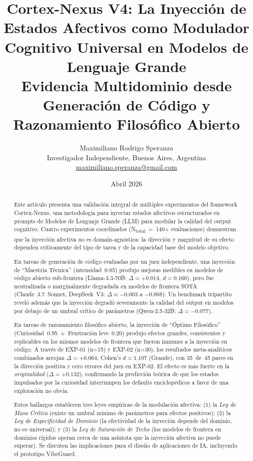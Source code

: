 \documentclass[12pt, a4paper]{article}
\title{\textbf{Cortex-Nexus V4: La Inyección de Estados Afectivos como Modulador Cognitivo Universal en Modelos de Lenguaje Grande}\\
\large{Evidencia Multidominio desde Generación de Código y Razonamiento Filosófico Abierto}}
\author{
  Maximiliano Rodrigo Speranza\\
  \small{Investigador Independiente, Buenos Aires, Argentina}\\
  \small{\href{mailto:maximiliano.speranza@gmail.com}{maximiliano.speranza@gmail.com}}
}
\date{Abril 2026}
\begin{document}
\maketitle
\begin{abstract}
Este artículo presenta una validación integral de múltiples experimentos del framework Cortex-Nexus, una metodología para inyectar estados afectivos estructurados en prompts de Modelos de Lenguaje Grande (LLM) para modular la calidad del output cognitivo. Cuatro experimentos coordinados (N\textsubscript{total}~=~140+ evaluaciones) demuestran que la inyección afectiva no es domain-agnóstica: la dirección y magnitud de su efecto dependen críticamente del tipo de tarea y de la capacidad base del modelo objetivo.

En tareas de generación de código evaluadas por un juez independiente, una inyección de ``Maestría Técnica'' (intensidad~0.85) produjo mejoras medibles en modelos de código abierto sub-frontera (Llama-3.3-70B: $\Delta = +0.014$, $d = 0.166$), pero fue neutralizada o marginalmente degradada en modelos de frontera SOTA (Claude~3.7~Sonnet, DeepSeek~V3: $\Delta \approx -0.003$ a $-0.008$). Un benchmark tripartito reveló además que la inyección degradó severamente la calidad del output en modelos por debajo de un umbral crítico de parámetros (Qwen-2.5-32B: $\Delta = -0.077$).

En tareas de razonamiento filosófico abierto, la inyección de ``Óptimo Filosófico'' (Curiosidad~0.95~+~Frustración leve~0.20) produjo efectos grandes, consistentes y replicables en los mismos modelos de frontera que fueron inmunes a la inyección en código. A través de EXP-01 (n=15) y EXP-02 (n=30), los resultados meta-analíticos combinados arrojan $\Delta = +0.064$, Cohen's $d = 1.107$ (Grande), con 35~de~45 pares en la dirección positiva y cero errores del juez en EXP-02. El efecto es más fuerte en la \textit{originalidad} ($\Delta = +0.132$), confirmando la predicción teórica de que los estados impulsados por la curiosidad interrumpen los defaults enciclopédicos a favor de una exploración no obvia.

Estos hallazgos establecen tres leyes empíricas de la modulación afectiva: (1) la \textit{Ley de Masa Crítica} (existe un umbral mínimo de parámetros para efectos positivos); (2) la \textit{Ley de Especificidad de Dominio} (la efectividad de la inyección depende del dominio, no es universal); y (3) la \textit{Ley de Saturación de Techo} (los modelos de frontera en dominios rígidos operan cerca de una asíntota que la inyección afectiva no puede superar). Se discuten las implicaciones para el diseño de aplicaciones de IA, incluyendo el prototipo VibeGuard.
\end{abstract}
\end{document}
